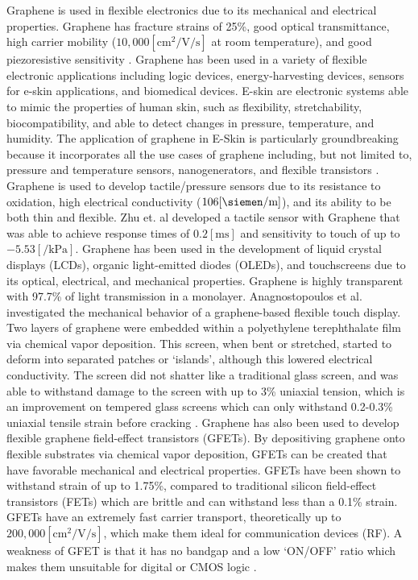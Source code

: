 \documentclass[conference]{IEEEtran}
\begin{document}
Graphene is used in flexible electronics due to its mechanical and electrical properties. Graphene has fracture strains of 25\%, good optical transmittance, high carrier mobility ($10,000[\si{\centi\meter\squared\per\volt\per\second}]$ at room temperature), and good piezoresistive sensitivity \cite{tc1}. Graphene has been used in a variety of flexible electronic applications including logic devices, energy-harvesting devices, sensors for e-skin applications, and biomedical devices. E-skin are electronic systems able to mimic the properties of human skin, such as flexibility, stretchability, biocompatibility, and able to detect changes in pressure, temperature, and humidity. The application of graphene in E-Skin is particularly groundbreaking because it incorporates all the use cases of graphene including, but not limited to, pressure and temperature sensors, nanogenerators, and flexible transistors \cite{tc1}. Graphene is used to develop tactile/pressure sensors due to its resistance to oxidation, high electrical conductivity ($106[\si{\siemen\per\meter}]$), and its ability to be both thin and flexible. Zhu et. al \cite{tc5} developed a tactile sensor with Graphene that was able to achieve response times of $0.2[\si{\milli\second}]$ and sensitivity to touch of up to $-5.53[\si{\per\kilo\pascal}]$. Graphene has been used in the development of liquid crystal displays (LCDs), organic light-emitted diodes (OLEDs), and touchscreens due to its optical, electrical, and mechanical properties. Graphene is highly transparent with 97.7\% of light transmission in a monolayer. Anagnostopoulos et al. \cite{tc6} investigated the mechanical behavior of a graphene-based flexible touch display. Two layers of graphene were embedded within a polyethylene terephthalate film via chemical vapor deposition. This screen, when bent or stretched, started to deform into separated patches or `islands', although this lowered electrical conductivity. The screen did not shatter like a traditional glass screen, and was able to withstand damage to the screen with up to 3\% uniaxial tension, which is an improvement on tempered glass screens which can only withstand 0.2-0.3\% uniaxial tensile strain before cracking \cite{tc6}. Graphene has also been used to develop flexible graphene field-effect transistors (GFETs). By depositiving graphene onto flexible substrates via chemical vapor deposition, GFETs can be created that have favorable mechanical and electrical properties. GFETs have been shown to withstand strain of up to 1.75\%, compared to traditional silicon field-effect transistors (FETs) which are brittle and can withstand less than a 0.1\% strain. GFETs have an extremely fast carrier transport, theoretically up to $200,000[\si{\centi\meter\squared\per\volt\per\second}]$, which make them ideal for communication devices (RF). A weakness of GFET is that it has no bandgap and a low `\textsc{ON/OFF}' ratio which makes them unsuitable for digital or CMOS logic \cite{tc7}.
\end{document}
